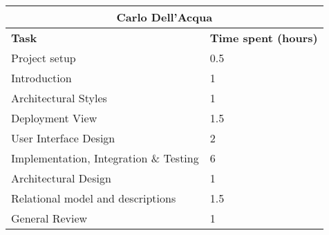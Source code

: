 \begin{table}[H]
  \centering
  \begin{tabular}{l|l}
    \multicolumn{2}{c}{\textbf{Carlo Dell'Acqua}} \\
    \hline
    \textbf{Task} & \textbf{Time spent (hours)}\\
    \hline
    Project setup & 0.5 \\
    Introduction & 1 \\
    Architectural Styles & 1 \\
    Deployment View & 1.5 \\
    User Interface Design & 2 \\
    Implementation, Integration \& Testing & 6 \\
    Architectural Design & 1 \\
    Relational model and descriptions & 1.5 \\
    General Review & 1 \\
  \end{tabular}
\end{table}